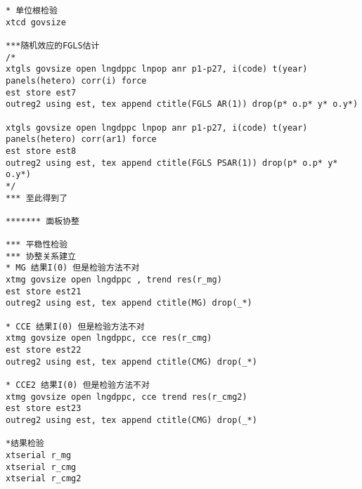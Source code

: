 \begin{framed}
\begin{verbatim}
* 单位根检验
xtcd govsize

***随机效应的FGLS估计
/*
xtgls govsize open lngdppc lnpop anr p1-p27, i(code) t(year) panels(hetero) corr(i) force
est store est7
outreg2 using est, tex append ctitle(FGLS AR(1)) drop(p* o.p* y* o.y*)

xtgls govsize open lngdppc lnpop anr p1-p27, i(code) t(year) panels(hetero) corr(ar1) force
est store est8
outreg2 using est, tex append ctitle(FGLS PSAR(1)) drop(p* o.p* y* o.y*)
*/
*** 至此得到了 

******* 面板协整

*** 平稳性检验
*** 协整关系建立
* MG 结果I(0) 但是检验方法不对
xtmg govsize open lngdppc , trend res(r_mg)   
est store est21
outreg2 using est, tex append ctitle(MG) drop(_*)

* CCE 结果I(0) 但是检验方法不对
xtmg govsize open lngdppc, cce res(r_cmg) 
est store est22
outreg2 using est, tex append ctitle(CMG) drop(_*)

* CCE2 结果I(0) 但是检验方法不对
xtmg govsize open lngdppc, cce trend res(r_cmg2)
est store est23
outreg2 using est, tex append ctitle(CMG) drop(_*)

*结果检验
xtserial r_mg
xtserial r_cmg
xtserial r_cmg2
\end{verbatim}
\end{framed}
